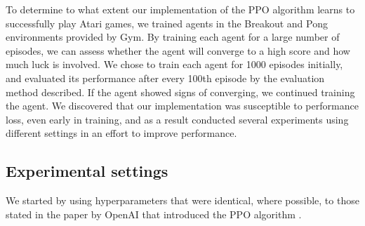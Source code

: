 \documentclass[12pt,a4paper]{article}
\begin{document}
To determine to what extent our implementation of the PPO algorithm learns to successfully play Atari games, we trained agents in the Breakout and Pong environments provided by Gym. By training each agent for a large number of episodes, we can assess whether the agent will converge to a high score and how much luck is involved. We chose to train each agent for 1000 episodes initially, and evaluated its performance after every 100th episode by the evaluation method described. If the agent showed signs of converging, we continued training the agent. We discovered that our implementation was susceptible to performance loss, even early in training, and as a result conducted several experiments using different settings in an effort to improve performance.

\subsection{Experimental settings}
We started by using hyperparameters that were identical, where possible, to those stated in the paper by OpenAI that introduced the PPO algorithm \cite{DBLP:journals/corr/SchulmanWDRK17}. 
\end{document}
